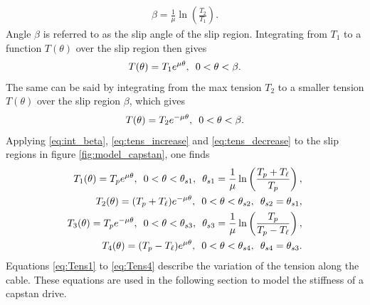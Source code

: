 \documentclass[10pt,cleanfoot]{asme2ej}
\newcommand{\hquad}{\hspace{0.5em}}
\begin{document}
\begin{align} 
\beta = \frac{1}{\mu}\ln\left(\frac{T_2}{T_1}\right).
\label{eq:int_beta}
\end{align}
Angle $\beta$ is referred to as the slip angle of the slip region. Integrating from $T_1$ to a function $T(\theta)$ over the slip region then gives \begin{align}
T(\theta) = T_1e^{\mu\theta},\hquad 0<\theta<\beta.\label{eq:tens_increase}
\end{align}
The same can be said by integrating from the max tension $T_2$ to a smaller tension $T(\theta)$ over the slip region $\beta$, which gives
\begin{align}
T(\theta) = T_2e^{-\mu\theta},\hquad 0<\theta<\beta.\label{eq:tens_decrease}
\end{align}
Applying \eqref{eq:int_beta}, \eqref{eq:tens_increase} and \eqref{eq:tens_decrease} to the slip regions in figure \ref{fig:model_capstan}, one finds
\begin{align}
    T_1(\theta) = T_pe^{\mu\theta},\hquad 0<\theta<\theta_{s1},\hquad \theta_{s1} = \frac{1}{\mu}\ln\left(\frac{T_p+T_\ell}{T_p}\right),\label{eq:Tens1}\\
    T_2(\theta) = (T_p+T_\ell)e^{-\mu\theta},\hquad 0<\theta<\theta_{s2},\hquad \theta_{s2}=\theta_{s1},\label{eq:Tens2}\\
    T_3(\theta) = T_pe^{-\mu\theta},\hquad 0<\theta<\theta_{s3},\hquad \theta_{s3} = \frac{1}{\mu}\ln\left(\frac{T_p}{T_p-T_\ell}\right),\label{eq:Tens3}\\
    T_4(\theta) = (T_p-T_\ell)e^{\mu\theta},\hquad 0<\theta<\theta_{s4},\hquad \theta_{s4} = \theta_{s3}.\label{eq:Tens4}
\end{align}
Equations \eqref{eq:Tens1} to \eqref{eq:Tens4} describe the variation of the tension along the cable. These equations are used in the following section to model the stiffness of a capstan drive.
\end{document}
